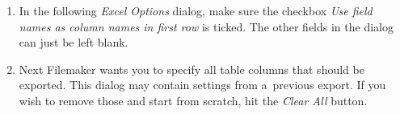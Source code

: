 \documentclass[12pt,a4paper]{scrartcl}
\begin{document}
\begin{enumerate}
  \item
    In the following \emph{Excel Options} dialog, make sure the checkbox
    \emph{Use field names as column names in first row} is ticked.
    The other fields in the dialog can just be left blank.\\[1ex]{}

  \item
    Next Filemaker wants you to specify all table columns that should be
    exported.
    This dialog may contain settings from a~previous export.
    If you wish to remove those and start from scratch, hit the \emph{Clear All}
    button.\\[1ex]{}


\end{enumerate}
\end{document}
